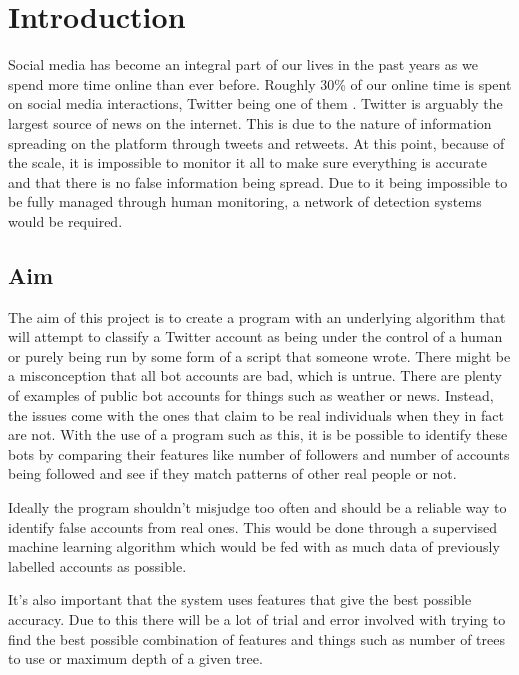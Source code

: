 
\chapter{Introduction} %

\label{Chapter1} %

Social media has become an integral part of our lives in the past years as we spend more time online than ever before. Roughly 30\% of our online time is spent on social media interactions, Twitter being one of them \cite{globalwebindex}.
Twitter is arguably the largest source of news on the internet. This is due to the nature of information spreading on the platform through tweets and retweets. At this point, because of the scale, it is impossible to monitor it all to make sure everything is accurate and that there is no false information being spread. Due to it being impossible to be fully managed through human monitoring, a network of detection systems would be required.

\section{Aim}
The aim of this project is to create a program with an underlying algorithm that will attempt to classify a Twitter account as being under the control of a human or purely being run by some form of a script that someone wrote. There might be a misconception that all bot accounts are bad, which is untrue. There are plenty of examples of public bot accounts for things such as weather or news. Instead, the issues come with the ones that claim to be real individuals when they in fact are not. With the use of a program such as this, it is be possible to identify these bots by comparing their features like number of followers and number of accounts being followed and see if they match patterns of other real people or not.


Ideally the program shouldn't misjudge too often and should be a reliable way to identify false accounts from real ones. This would be done through a supervised machine learning algorithm which would be fed with as much data of previously labelled accounts as possible.


It's also important that the system uses features that give the best possible accuracy. Due to this there will be a lot of trial and error involved with trying to find the best possible combination of features and things such as number of trees to use or maximum depth of a given tree. 

